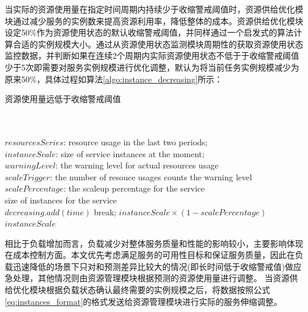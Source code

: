 当实际的资源使用量在指定时间周期内持续少于收缩警戒阈值时，资源供给优化模块通过减少服务的实例数来提高资源利用率，降低整体的成本。资源供给优化模块设定50\%作为资源使用状态的默认收缩警戒阈值，并同样通过一个启发式的算法计算合适的实例规模大小。通过从资源使用状态监测模块周期性的获取资源使用状态监控数据，并判断如果在连续2个周期内实际资源使用状态不低于于收缩警戒阈值少于5次即需要对服务实例规模进行优化调整，默认为将当前任务实例规模减少为原来50\%，具体过程如算法\ref{algo:instance_decreasing}所示：
\begin{algorithm}[H]
\caption{资源使用量远低于收缩警戒阈值}
\label{algo:instance_decreasing}
\begin{algorithmic}[0]
\\
\Require ~~\
\\
$resourcesSeries$: resource usage in the last two periods;\\
$instanceScale$: size of service instances at the moment;\\
$warningLevel$: the warning level for actual resources usage \\
$scaleTrigger$: the number of resouce usages counts the warning level \\
$scalePercentage$: the scaleup percentage for the service
\Ensure ~~\
\\
size of instances for the service \\

            \State $decreasing.add(time)$
            \State break;
        \EndIf
    \EndFor
        \State \Return $instanceScale \times (1-scalePercentage)$
    \Else
        \State \Return $instanceScale$
    \EndIf
\EndFor
\end{algorithmic}
\end{algorithm}

相比于负载增加而言，负载减少对整体服务质量和性能的影响较小，主要影响体现在成本控制方面。本文优先考虑满足服务的可用性目标和保证服务质量，因此在负载迅速降低的场景下只对和预测差异比较大的情况(即长时间低于收缩警戒值)做应急处理，其他情况则由资源管理模块根据预测的资源使用量进行调整。
当资源供给优化模块根据负载状态确认最终需要的实例规模之后，将数据按照公式\ref{eq:instances_format}的格式发送给资源管理模块进行实际的服务伸缩调整。


